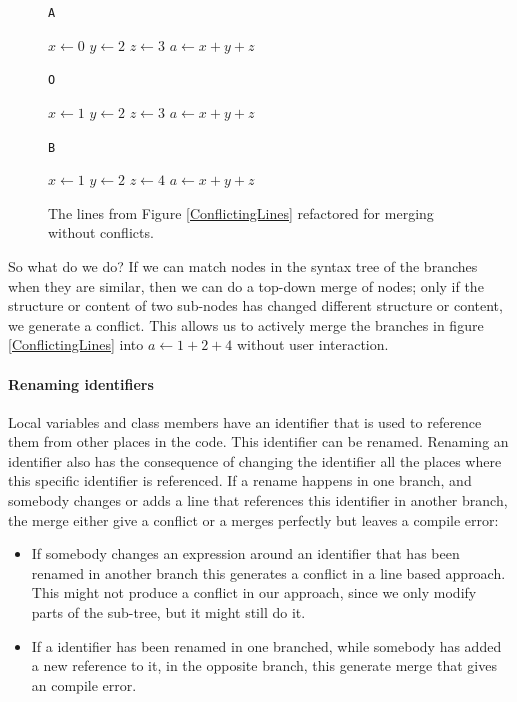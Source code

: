 \documentclass[11pt]{article}
\begin{document}
\begin{figure}
\begin{multicols*}{3}

\texttt{A}

\begin{algorithmic}
	\State $x \gets 0$
	\State $y \gets 2$
	\State $z \gets 3$
	\State $a \gets x+y+z$
\end{algorithmic}

\columnbreak

\texttt{O}

\begin{algorithmic}
	\State $x \gets 1$
	\State $y \gets 2$
	\State $z \gets 3$
	\State $a \gets x+y+z$
\end{algorithmic}

\columnbreak

\texttt{B}
 
\begin{algorithmic}
	\State $x \gets 1$
	\State $y \gets 2$
	\State $z \gets 4$
	\State $a \gets x+y+z$
\end{algorithmic}

\end{multicols*}
\caption{The lines from Figure \ref{ConflictingLines} refactored for merging without conflicts.}
\label{RefactoredForNoConflict}
\end{figure}

So what do we do? If we can match nodes in the syntax tree of the branches when they are similar, then we can do a top-down merge of nodes; only if the structure or content of two sub-nodes has changed different structure or content, we generate a conflict. This allows us to actively merge the branches in figure \ref{ConflictingLines} into $a \gets 1+2+4$ without user interaction.

\paragraph{Renaming identifiers} Local variables and class members have an identifier that is used to reference them from other places in the code. This identifier can be renamed. Renaming an identifier also has the consequence of changing the identifier all the places where this specific identifier is referenced. If a rename happens in one branch, and somebody changes or adds a line that references this identifier in another branch, the merge either give a conflict or a merges perfectly but leaves a compile error: 

\begin{itemize}
\item If somebody changes an expression around an identifier that has been renamed in another branch this generates a conflict in a line based approach. This might not produce a conflict in our approach, since we only modify parts of the sub-tree, but it might still do it.
\item If a identifier has been renamed in one branched, while somebody has added a new reference to it, in the opposite branch, this generate merge that gives an compile error.
\end{itemize}
\end{document}
